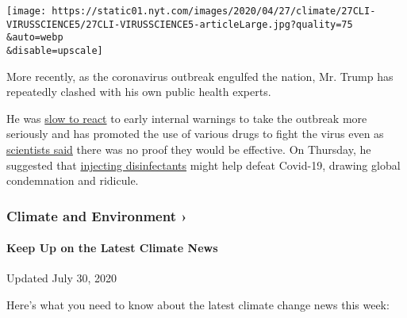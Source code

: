 \texttt{[image: https://static01.nyt.com/images/2020/04/27/climate/27CLI-VIRUSSCIENCE5/27CLI-VIRUSSCIENCE5-articleLarge.jpg?quality=75\\\&auto=webp\\\&disable=upscale]}

More recently, as the coronavirus outbreak engulfed the nation, Mr.
Trump has repeatedly clashed with his own public health experts.

He was
\href{https://www.nytimes.com/2020/04/11/us/politics/coronavirus-trump-response.html?action=click\&module=RelatedLinks\&pgtype=Article}{slow
to react} to early internal warnings to take the outbreak more seriously
and has promoted the use of various drugs to fight the virus even as
\href{https://www.nytimes.com/2020/04/21/health/nih-covid-19-treatment.html}{scientists
said} there was no proof they would be effective. On Thursday, he
suggested that
\href{https://www.nytimes.com/2020/04/24/health/sunlight-coronavirus-trump.html}{injecting
disinfectants} might help defeat Covid-19, drawing global condemnation
and ridicule.

\href{https://www.nytimes.com/section/climate?action=click\&pgtype=Article\&state=default\&region=MAIN_CONTENT_1\&context=storylines_keepup}{}

\hypertarget{climate-and-environment-}{%
\subsubsection{Climate and Environment
›}\label{climate-and-environment-}}

\hypertarget{keep-up-on-the-latest-climate-news}{%
\paragraph{Keep Up on the Latest Climate
News}\label{keep-up-on-the-latest-climate-news}}

Updated July 30, 2020

Here's what you need to know about the latest climate change news this
week:

